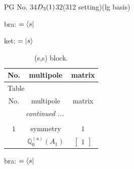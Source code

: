 \documentclass[fleqn,8pt,landscape]{jsarticle}
\begin{document}
\setcounter{MaxMatrixCols}{32}

\renewcommand{\tablename}{Table~}
\renewcommand{\figurename}{Figure~}
\begin{center}
\LARGE
PG No. 34\quad$D_{\rm 3}(1)$\quad$32$\quad(312 setting)\quad[ trigonal ] (lg basis)
\end{center}
bra: $=\bra{s}$

\noindent
ket: $=\ket{s}$
\renewcommand{\arraystretch}{1.6}
\begin{longtable}{ccc}
\caption{(s,s) block.}
 \\
 \hline \hline
No. & multipole & matrix \\ \hline \endfirsthead

\multicolumn{2}{l}{\tablename\ \thetable{}} \\
 \hline \hline
No. & multipole & matrix \\ \hline \endhead

 \hline \hline
\multicolumn{2}{r}{\footnotesize\it continued ...} \\ \endfoot

 \hline \hline
\multicolumn{2}{r}{} \\ \endlastfoot

$ 1 $ & $ \text{symmetry} $ & $ 1 $ \\
$  $ & $ \mathbb{Q}_{0}^{(a)}(A_{1}) $ & $ \begin{bmatrix} 1 \end{bmatrix} $ \\ \hline
\end{longtable}
bra: $=\bra{s}$
\end{document}
